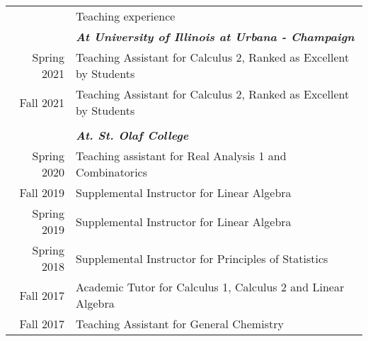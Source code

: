 \documentclass[letterpaper, 11pt]{article}
\newcommand{\headingfont}{\Large\color{Red}}
\newenvironment{SectionTable}[1]{
	\renewcommand*{\arraystretch}{1.7}
	\setlength{\tabcolsep}{10pt}
	\begin{longtable}{Rp{5.2in}} & #1 \\}
	{\end{longtable}\vspace{-.3cm}}
\begin{document}
	\begin{SectionTable}{\headingfont Teaching experience}
		& \textit{\textbf{At University of Illinois at Urbana - Champaign}}\\
		Spring 2021 & 
		Teaching Assistant for Calculus 2, Ranked as Excellent by Students\\
		Fall 2021 & 
		Teaching Assistant for Calculus 2, Ranked as Excellent by Students\\
		\\
		& \textit{\textbf{At. St. Olaf College}} \\
		Spring 2020 & 
		Teaching assistant for Real Analysis 1 and Combinatorics \\
		Fall 2019 & 
		Supplemental Instructor for Linear Algebra\\
		Spring 2019 & 
		Supplemental Instructor for Linear Algebra\\
		Spring 2018 & 
		Supplemental Instructor for Principles of Statistics\\
		Fall 2017 & 
		Academic Tutor for Calculus 1, Calculus 2 and Linear Algebra\\
		Fall 2017 & 
		Teaching Assistant for General Chemistry  \\
	
		

	\end{SectionTable}
	
	
	
	
	
\end{document}
